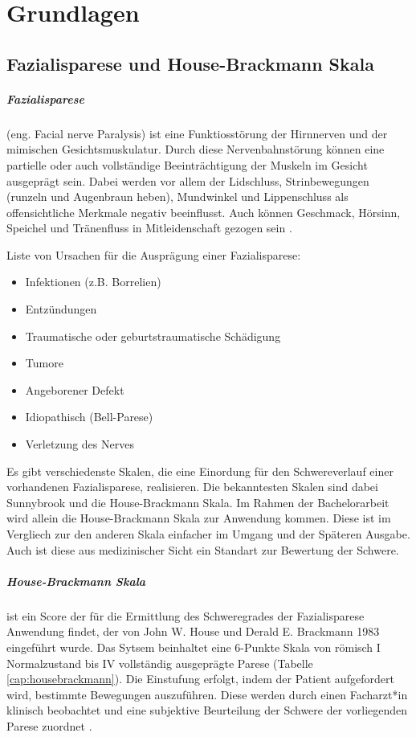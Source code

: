 


\chapter{Grundlagen}\label{basics}
\section{Fazialisparese und House-Brackmann Skala}\label{facialpalsy}
\paragraph{Fazialisparese} (eng. Facial nerve Paralysis) ist eine Funktiosstörung der Hirnnerven und der mimischen Gesichtsmuskulatur. Durch diese Nervenbahnstörung können eine partielle oder auch vollständige Beeinträchtigung der Muskeln im Gesicht ausgeprägt sein. Dabei werden vor allem der Lidschluss, Strinbewegungen (runzeln und Augenbraun heben), Mundwinkel und Lippenschluss als offensichtliche Merkmale negativ beeinflusst. Auch können Geschmack, Hörsinn, Speichel und Tränenfluss in Mitleidenschaft gezogen sein \cite{facialpalsy_1}\cite{facialpalsy_2}.

Liste von Ursachen für die Ausprägung einer Fazialisparese:
\begin{itemize}
  \setlength\itemsep{-0.5em}
\item Infektionen (z.B. Borrelien)
\item Entzündungen
\item Traumatische oder geburtstraumatische
Schädigung
\item Tumore
\item Angeborener Defekt
\item Idiopathisch (Bell-Parese)
\item Verletzung des Nerves
\end{itemize}

Es gibt verschiedenste Skalen, die eine Einordung für den Schwereverlauf einer vorhandenen Fazialisparese, realisieren. Die bekanntesten Skalen sind dabei Sunnybrook und die House-Brackmann Skala. Im Rahmen der Bachelorarbeit wird allein die House-Brackmann Skala zur Anwendung kommen. Diese ist im Vergliech zur den anderen Skala einfacher im Umgang und der Späteren Ausgabe. Auch ist diese aus medizinischer Sicht ein Standart zur Bewertung der Schwere.




\paragraph{House-Brackmann Skala} ist ein Score der für die Ermittlung des Schweregrades der Fazialisparese Anwendung findet, der von John W. House und Derald E. Brackmann 1983 eingeführt wurde. Das Sytsem beinhaltet eine 6-Punkte Skala von römisch I Normalzustand bis IV vollständig ausgeprägte Parese (Tabelle \ref{cap:housebrackmann}). Die Einstufung erfolgt, indem der Patient aufgefordert wird, bestimmte Bewegungen auszuführen. Diese werden durch einen Facharzt*in klinisch beobachtet und eine subjektive Beurteilung der Schwere der vorliegenden Parese zuordnet \cite{housebrackmann}.

